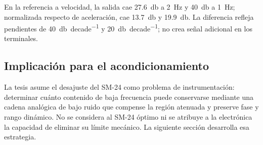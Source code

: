 En la referencia a velocidad, la salida cae \SI{27.6}{\decibel} a \SI{2}{\hertz} y
\SI{40}{\decibel} a \SI{1}{\hertz}; normalizada respecto de aceleración, cae
\SI{13.7}{\decibel} y \SI{19.9}{\decibel}. La diferencia refleja pendientes de
\SI{40}{\decibel\per decade} y \SI{20}{\decibel\per decade}; no crea señal adicional
en los terminales.

\subsection{Implicación para el acondicionamiento}

La tesis asume el desajuste del SM-24 como problema de instrumentación: determinar cuánto
contenido de baja frecuencia puede conservarse mediante una cadena analógica de bajo
ruido que compense la región atenuada y preserve fase y rango dinámico. No se considera
al SM-24 óptimo ni se atribuye a la electrónica la capacidad de eliminar su límite
mecánico. La siguiente sección desarrolla esa estrategia.
